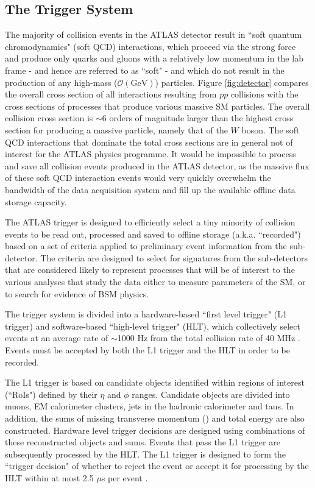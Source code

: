 \subsection{The Trigger System}
\label{sec:trigger}

The majority of collision events in the ATLAS detector result in ``soft quantum chromodynamics" (soft QCD) interactions, which proceed via the strong force and produce only quarks and gluons with a relatively low momentum in the lab frame - and hence are referred to as ``soft" - and which do not result in the production of any high-mass (\(\mathcal{O}(\text{GeV})\)) particles. Figure \ref{fig:detector} compares the overall cross section of all interactions resulting from \(pp\) collisions with the cross sections of processes that produce various massive SM particles. The overall collision cross section is \(\sim\)6 orders of magnitude larger than the highest cross section for producing a massive particle, namely that of the \(W\) boson. The soft QCD interactions that dominate the total cross sections are in general not of interest for the ATLAS physics programme. It would be impossible to process and save all collision events produced in the ATLAS detector, as the massive flux of these soft QCD interaction events would very quickly overwhelm the bandwidth of the data acquisition system and fill up the available offline data storage capacity. 

The ATLAS trigger \cite{ATLAS_Trigger} is designed to efficiently select a tiny minority of collision events to be read out, processed and saved to offline storage (a.k.a. ``recorded") based on a set of criteria applied to preliminary event information from the sub-detector. The criteria are designed to select for signatures from the sub-detectors that are considered likely to represent processes that will be of interest to the various analyses that study the data either to measure parameters of the SM, or to search for evidence of BSM physics.

The trigger system is divided into a hardware-based ``first level trigger" (L1 trigger) and software-based ``high-level trigger" (HLT), which collectively select events at an average rate of \(\sim\)1000 Hz from the total collision rate of 40 MHz \cite{ATLAS_Trigger}. Events must be accepted by both the L1 trigger and the HLT in order to be recorded.

The L1 trigger is based on candidate objects identified within regions of interest (``RoIs") defined by their \(\eta\) and \(\phi\) ranges. Candidate objects are divided into muons, EM calorimeter clusters, jets in the hadronic calorimeter and taus. In addition, the sums of missing transverse momentum (\met) and total energy are also constructed. Hardware level trigger decisions are designed using combinations of these reconstructed objects and sums. Events that pass the L1 trigger are subsequently processed by the HLT. The L1 trigger is designed to form the ``trigger decision" of whether to reject the event or accept it for processing by the HLT within at most 2.5 \(\mu\)s per event \cite{ATLAS_Trigger}. 

